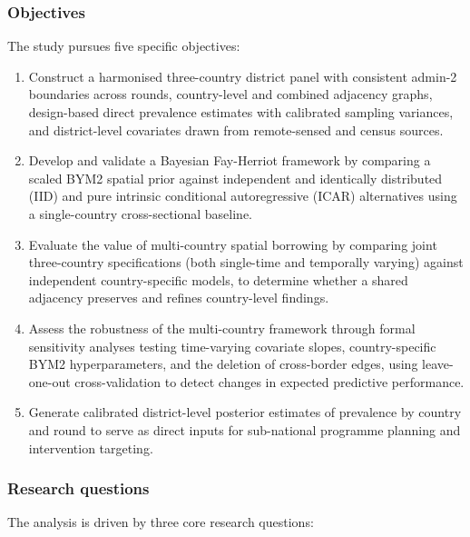 \documentclass{article}
\begin{document}
\subsubsection{Objectives}\label{objectives}

The study pursues five specific objectives:

\begin{enumerate}
\item Construct a harmonised three-country district panel with consistent admin-2 boundaries across rounds, country-level and combined adjacency graphs, design-based direct prevalence estimates with calibrated sampling variances, and district-level covariates drawn from remote-sensed and census sources.
\item Develop and validate a Bayesian Fay-Herriot framework by comparing a scaled BYM2 spatial prior against independent and identically distributed (IID) and pure intrinsic conditional autoregressive (ICAR) alternatives using a single-country cross-sectional baseline.
\item Evaluate the value of multi-country spatial borrowing by comparing joint three-country specifications (both single-time and temporally varying) against independent country-specific models, to determine whether a shared adjacency preserves and refines country-level findings.
\item Assess the robustness of the multi-country framework through formal sensitivity analyses testing time-varying covariate slopes, country-specific BYM2 hyperparameters, and the deletion of cross-border edges, using leave-one-out cross-validation to detect changes in expected predictive performance.
\item Generate calibrated district-level posterior estimates of prevalence by country and round to serve as direct inputs for sub-national programme planning and intervention targeting.
\end{enumerate}

\subsubsection{Research questions}\label{research-questions}

The analysis is driven by three core research questions:
\end{document}
